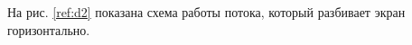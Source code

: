 \begin{figure}[ht!]
\end{figure}

На рис. \ref{ref:d2} показана схема работы потока, который разбивает
экран горизонтально.

